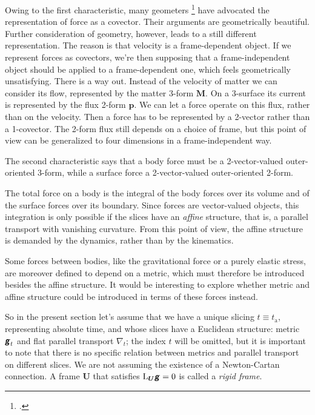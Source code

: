 \documentclass[\ifafour a4paper,12pt,\else a5paper,10pt,\fi%
onecolumn,oneside,article,%
british%
]{memoir}
\theoremstyle{remark}
\theoremstyle{innote}
\newcommand*{\mathte}[1]{\textbf{\textit{\textsf{#1}}}}
\newcommand*{\citep}{\footcites}%
\renewcommand*{\|}{\nonscript\,\vert\nonscript\;\mathopen{}}
\newcommand*{\Li}{\mathrm{L}}
\newcommand*{\yrr}{M}
\newcommand*{\yr}{\bm{\yrr}}
\newcommand*{\ytn}{t_{\textrm{a}}}
\newcommand*{\yjj}{p}
\newcommand*{\yj}{\bm{\yjj}}
\newcommand*{\yFF}{U}
\newcommand*{\yF}{\bm{\yFF}}
\newcommand*{\ygg}{g}
\newcommand*{\yg}{\mathte{\ygg}}
\newcommand*{\ynab}{\nabla}
\begin{document}
Owing to the first characteristic, many geometers
\citep{vandantzig1954,burke1980b,burke1985_r1987,burke1995,bossavit1991,bossavit1998b,hehletal1999,hehletal2003}
have advocated the representation of force as a covector. Their arguments
are geometrically beautiful. Further consideration of geometry, however,
leads to a still different representation. The reason is that velocity is a
frame-dependent object. If we represent forces as covectors, we're then
supposing that a frame-independent object should be applied to a
frame-dependent one, which feels geometrically unsatisfying. There is a way
out. Instead of the velocity of matter we can consider its flow,
represented by the matter 3-form $\yr$. On a 3-surface its current is
represented by the flux 2-form $\yj$. We can let a force operate on this
flux, rather than on the velocity. Then a force has to be represented by a
2-vector rather than a 1-covector. The 2-form flux still depends on a
choice of frame, but this point of view can be generalized to four
dimensions in a frame-independent way.

The second characteristic says that a body force must be a 2-vector-valued
outer-oriented 3-form, while a surface force a 2-vector-valued
outer-oriented 2-form.

The total force on a body is the integral of the body forces over its
volume and of the surface forces over its boundary. Since forces are
vector-valued objects, this integration is only possible if the slices
have an \emph{affine} structure, that is, a parallel transport with
vanishing curvature. From this point of view, the affine structure is
demanded by the dynamics, rather than by the kinematics.

Some forces between bodies, like the gravitational force or a purely
elastic stress, are moreover defined to depend on a metric, which must
therefore be introduced besides the affine structure. It would be
interesting to explore whether metric and affine structure could be
introduced in terms of these forces instead.

So in the present section let's assume that we have a unique slicing
$t\equiv\ytn$, representing absolute time, and whose slices have a
Euclidean structure: metric $\yg_t$ and flat parallel transport $\ynab_t$;
the index $t$ will be omitted, but it is important to note that there is no
specific relation between metrics and parallel transport on different
slices. We are not assuming the existence of a Newton-Cartan connection. A
frame $\yF$ that satisfies $\Li_{\yF}\yg = 0$ is called a \emph{rigid
  frame}.
\end{document}
